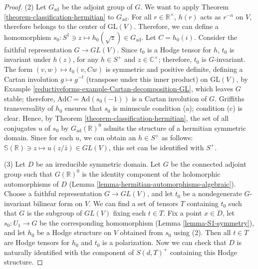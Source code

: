 \begin{proof}
(2) Let $G_{\text{ad}}$ be the adjoint group of $G$. We want to apply Theorem \ref{theorem-classification-hermitian} to $G_{\text{ad}}$. For all $r\in \mathbb R^\times$, $h(r)$ acts as $r^{-n}$ on $V$, therefore belongs to the center of $\text{GL}(V)$. Therefore, we can define a homomorphism $s_0:S^1 \ni z\mapsto h_0(\sqrt z) \in G_{\text{ad}}$. Let $C=h_0(i)$.  Consider the faithful representation $G \to GL(V)$. Since $t_0$ is a Hodge tensor for $h$, $t_0$ is invariant under $h(z)$, for any $h\in S^+$ and $z\in \mathbb C^ \times$; therefore, $t_0$ is $G$-invariant.  The form $(v,w)\mapsto t_0(v, Cw)$ is symmetric and positive definite, defining a Cartan involution $g\mapsto g^{-t}$ (transpose under this inner product) on $\text{GL}(V)$, by Example \ref{reductiveforms-example-Cartan-decomposition-GL}, which leaves $G$ stable; therefore, $\text{Ad}C=\text{Ad}(s_0(-1))$ is a Cartan involution of $G$. Griffiths transversality of $h_0$ ensures that $s_0$ is minuscule condition (a); condition (c) is clear. Hence, by Theorem \ref{theorem-classification-hermitian}, the set of all conjugates $u$ of $s_0$ by $G_{\text{ad}}(\mathbb R)^0$ admits the structure of a hermitian symmetric domain.  Since for each $u$, we can obtain an $h\in S^+$ as follows: $\mathbb S(\mathbb R) \ni z  \mapsto u(z/\bar z)\in GL(V)$, this set can be identified with $S^+$.

(3) Let $D$ be an irreducible symmetric domain.  Let $G$ be the connected adjoint group such that $G(\mathbb R)^0$ is the identity component of the holomorphic automorphisms of $D$ (Lemma \ref{lemma-hermitian-automorphisms-algebraic}). Choose a faithful representation $G \to GL(V)$, and let $t_0$ be a nondegenerate $G$-invariant bilinear form on $V$. We can find a set of tensors $T$ containing $t_0$ such that $G$ is the subgroup of $GL(V)$ fixing each $t \in T$. Fix a point $x\in D$, let $s_0:U_1\to G$ be the corresponding homomorphism (Lemma \ref{lemma-S1-symmetry}), and let $h_0$ be a Hodge structure on $V$ obtained from $s_0$ using (2). Then all $t \in T$ are Hodge tensors for $h_0$ and $t_0$ is a polarization. Now we can check that $D$ is naturally identified with the component of $S(d,T)^+$ containing this Hodge structure. 
\end{proof}












